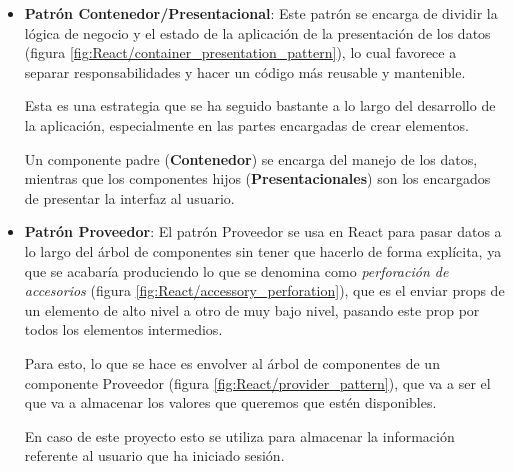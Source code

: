 \begin{itemize}
	\item \textbf{Patrón Contenedor/Presentacional}: Este patrón se encarga de dividir la lógica de negocio y el estado de la aplicación de la presentación de los datos (figura \ref{fig:React/container_presentation_pattern}), lo cual favorece a separar responsabilidades y hacer un código más reusable y mantenible. 

	Esta es una estrategia que se ha seguido bastante a lo largo del desarrollo de la aplicación, especialmente en las partes encargadas de crear elementos. 
	
	Un componente padre (\textbf{Contenedor}) se encarga del manejo de los datos, mientras que los componentes hijos (\textbf{Presentacionales}) son los encargados de presentar la interfaz al usuario.
	
	
	\item \textbf{Patrón Proveedor}: El patrón Proveedor se usa en React para pasar datos a lo largo del árbol de componentes sin tener que hacerlo de forma explícita, ya que se acabaría produciendo lo que se denomina como \textit{perforación de accesorios} (figura \ref{fig:React/accessory_perforation}), que es el enviar props de un elemento de alto nivel a otro de muy bajo nivel, pasando este prop por todos los elementos intermedios. 
	

	Para esto, lo que se hace es envolver al árbol de componentes de un componente Proveedor (figura \ref{fig:React/provider_pattern}), que va a ser el que va a almacenar los valores que queremos que estén disponibles. 
	
	
	En caso de este proyecto esto se utiliza para almacenar la información referente al usuario que ha iniciado sesión.
\end{itemize}